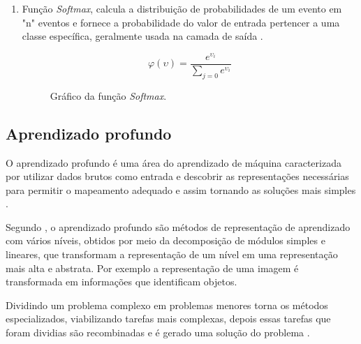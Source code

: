 \documentclass[
	12pt,				%
	openright,			%
	twoside,			%
	a4paper,			%
	english,			%
	french,				%
	spanish,			%
	brazil				%
	]{abntex2}
\begin{document}
\begin{enumerate}
	\item Função \textit{Softmax}, calcula a distribuição de probabilidades de um evento em "n" eventos e fornece a probabilidade do valor de entrada pertencer a uma classe específica, geralmente usada na camada de saída \cite{gharat2019what}.
	\begin{figure}[H]
	\begin{center}
		\begin{minipage}{0.45\textwidth}
			$$\varphi(\upsilon) = \frac{e^{\upsilon_i}}{\sum_{j=0} e^{\upsilon_i}}$$
		\end{minipage}
		\hfill
		\begin{minipage}{0.45\textwidth}
		\end{minipage}
	\end{center}
	\caption{Gráfico da função \textit{Softmax}.}
	\label{fig:grafico_softmax}
	\end{figure}
\end{enumerate}



\subsection{Aprendizado profundo}

O aprendizado profundo é uma área do aprendizado de máquina caracterizada por utilizar dados brutos como entrada e descobrir as representações necessárias para permitir o mapeamento adequado e assim tornando as soluções mais simples .

Segundo , o aprendizado profundo são métodos de representação de aprendizado com vários níveis, obtidos por meio da decomposição de módulos simples e lineares, que transformam a representação de um nível em uma representação mais alta e abstrata. Por exemplo a representação de uma imagem é transformada em informações que identificam objetos.

Dividindo um problema complexo em problemas menores torna os métodos especializados, viabilizando tarefas mais complexas, depois essas tarefas que foram dividias são recombinadas e é gerado uma solução do problema \cite{marti2017aprendizado}.
\end{document}
